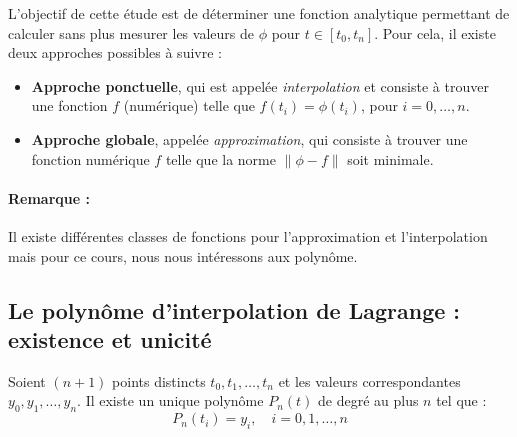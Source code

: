 L'objectif de cette étude est de déterminer une fonction analytique permettant de calculer sans plus mesurer les valeurs de $\phi$ pour $t \in [t_0, t_n]$. Pour cela, il existe deux approches possibles à suivre :

\begin{itemize}
	\item \textbf{Approche ponctuelle}, qui est appelée \textit{interpolation} et consiste à trouver une fonction $f$ (numérique) telle que $f(t_i) = \phi(t_i)$, pour $i = 0, \dots, n$.
	
	\item \textbf{Approche globale}, appelée \textit{approximation}, qui consiste à trouver une fonction numérique $f$ telle que la norme $\| \phi - f \|$ soit minimale.
\end{itemize}

\paragraph{Remarque :}
Il existe différentes classes de fonctions pour l'approximation et l'interpolation mais pour ce cours, nous nous intéressons aux polynôme.

\subsection{Le polynôme d'interpolation de Lagrange : existence et unicité}

\begin{theoreme}
	Soient $(n+1)$ points distincts $t_0, t_1, \ldots, t_n$ et les valeurs correspondantes $y_0, y_1, \ldots, y_n$. Il existe un unique polynôme $P_n(t)$ de degré au plus $n$ tel que :
	$$P_n(t_i) = y_i, \quad i = 0, 1, \ldots, n$$
\end{theoreme}

